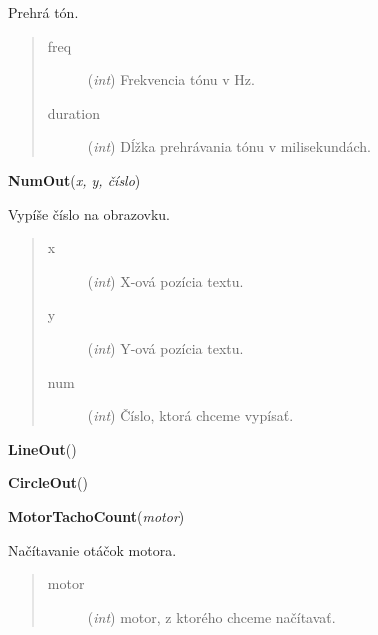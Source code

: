\documentclass[10pt,a4paper]{article}
\begin{document}
    Prehrá tón.



    

\begin{quote}
    \begin{description}
        
\item[freq] ({\emph{int}}) Frekvencia tónu v Hz.

\item[duration] ({\emph{int}}) Dĺžka prehrávania tónu v milisekundách.

    \end{description}
\end{quote}

 

\vspace{6pt}
{\bf NumOut}({\it x, y, číslo}) 
    
    Vypíše číslo na obrazovku.
 



    

\begin{quote}
    \begin{description}
        
\item[x] ({\emph{int}}) X-ová pozícia textu.

\item[y] ({\emph{int}})  Y-ová pozícia textu.

\item[num] ({\emph{int}}) Číslo, ktorá chceme vypísať.

    \end{description}
\end{quote}

 

\vspace{6pt}
{\bf LineOut}({\it }) 

 

\vspace{6pt}
{\bf CircleOut}({\it }) 

 

\vspace{6pt}
{\bf MotorTachoCount}({\it motor}) 
    
    Načítavanie otáčok motora.


    

\begin{quote}
    \begin{description}
        
\item[motor] ({\emph{int}}) motor, z ktorého chceme načítavať.

    \end{description}
\end{quote}
\end{document}
